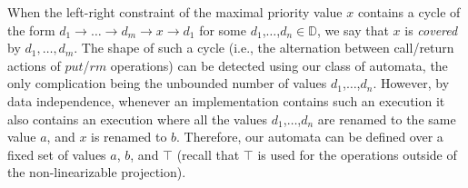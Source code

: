 When the left-right constraint of the maximal priority value $x$ contains a cycle of the form $d_1 \rightarrow \ldots \rightarrow d_m \rightarrow x \rightarrow d_1$ for some $d_1$,$\ldots$,$d_n\in \mathbb{D}$, we say that $x$ is \emph{covered} by $d_1,\ldots,d_m$. The shape of such a cycle (i.e., the alternation between call/return actions of $\textit{put}$/$\textit{rm}$ operations) can be detected using our class of automata, the only complication being the unbounded number of values $d_1$,$\ldots$,$d_n$. However, by data independence, whenever an implementation contains such an execution it also contains an execution where all the values $d_1$,$\ldots$,$d_n$ are renamed to the same value $a$, and $x$ is renamed to $b$. Therefore, our automata can be defined over a fixed set of values $a$, $b$, and $\top$ (recall that $\top$ is used for the operations outside of the non-linearizable projection).

